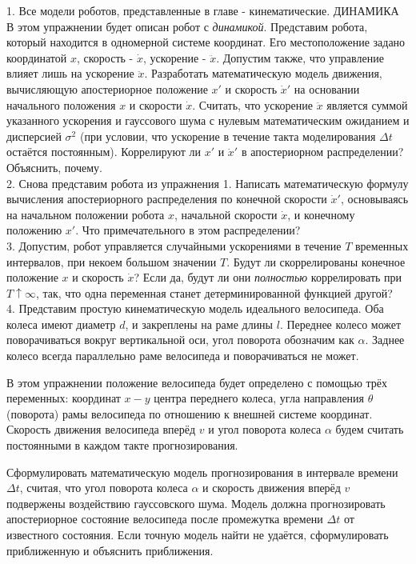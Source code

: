 \documentclass[10pt,a4paper]{article}
\begin{document}
1. Все модели роботов, представленные в главе - кинематические.
ДИНАМИКА
В этом упражнении будет описан робот с \textit{динамикой}. Представим робота, который находится в одномерной системе координат. Его местоположение задано координатой $x$, скорость - $\dot{x}$, ускорение - $\ddot{x}$. Допустим также, что управление влияет лишь на ускорение $\ddot{x}$. Разработать математическую модель движения, вычисляющую апостериорное положение $x'$ и скорость $\dot{x}'$ на основании начального положения $x$ и скорости $\dot{x}$. Считать, что ускорение $\ddot{x}$ является суммой указанного ускорения и гауссового шума с нулевым математическим ожиданием и дисперсией $\sigma^2$ (при условии, что ускорение в течение такта моделирования $\varDelta t$ остаётся постоянным).
Коррелируют ли $x'$ и $\dot{x}'$ в апостериорном распределении? Объяснить, почему.\\

2. Снова представим робота из упражнения 1. Написать математическую формулу вычисления апостериорного распределения по конечной скорости $\dot{x}'$, основываясь на начальном положении робота $x$, начальной скорости $\dot{x}$, и конечному положению $x'$. Что примечательного в этом распределении?\\

3. Допустим, робот управляется случайными ускорениями в течение $T$ временных интервалов, при некоем большом значении $T$. Будут ли скоррелированы конечное положение $x$ и скорость $\dot{x}$? Если да, будут ли они \textit{полностью} коррелировать при $T\uparrow\infty$, так, что одна переменная станет детерминированной функцией другой?\\

4. Представим простую кинематическую модель идеального велосипеда. Оба колеса имеют диаметр $d$, и закреплены на раме длины $l$. Переднее колесо может поворачиваться вокруг вертикальной оси, угол поворота обозначим как $\alpha$.
Заднее колесо всегда параллельно раме велосипеда и поворачиваться не может.

В этом упражнении положение велосипеда будет определено с помощью трёх переменных: координат $x-y$ центра переднего колеса, угла направления $\theta$ (поворота) рамы велосипеда по отношению к внешней системе координат. Скорость движения велосипеда вперёд $v$ и угол поворота колеса $\alpha$ будем считать постоянными в каждом такте прогнозирования.

Сформулировать математическую модель прогнозирования в интервале времени $\varDelta t$, считая, что угол поворота колеса $\alpha$  и скорость движения вперёд $v$ подвержены воздействию гауссовского шума. Модель должна прогнозировать апостериорное состояние велосипеда после промежутка времени $\varDelta t$ от известного состояния. Если точную модель найти не удаётся, сформулировать приближенную и объяснить приближения.\\
\end{document}
